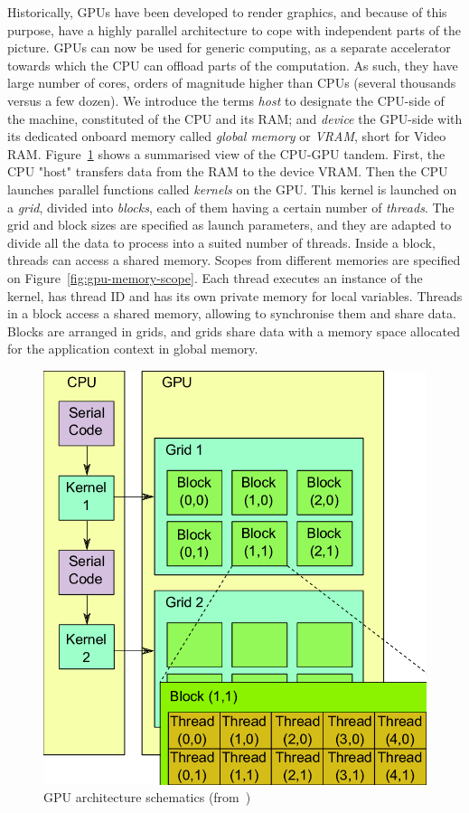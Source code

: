 Historically, GPUs have been developed to render graphics, and because of this purpose, have a highly parallel architecture to cope with independent parts of the picture. GPUs can now be used for generic computing, as a separate accelerator towards which the CPU can offload parts of the computation. As such, they have large number of cores, orders of magnitude higher than CPUs (several thousands versus a few dozen). We introduce the terms \emph{host} to designate the CPU-side of the machine, constituted of the CPU and its RAM; and \emph{device} the GPU-side with its dedicated onboard memory called \emph{global memory} or \emph{VRAM}, short for Video RAM. Figure~\ref{fig:gpu-arch} shows a summarised view of the CPU-GPU tandem. First, the CPU "host" transfers data from the RAM to the device VRAM. Then the CPU launches parallel functions called \emph{kernels} on the GPU. This kernel is launched on a \emph{grid}, divided into \emph{blocks}, each of them having a certain number of \emph{threads}. The grid and block sizes are specified as launch parameters, and they are adapted to divide all the data to process into a suited number of threads. Inside a block, threads can access a shared memory. Scopes from different memories are specified on Figure~\ref{fig:gpu-memory-scope}. Each thread executes an instance of the kernel, has thread ID and has its own private memory for local variables. Threads in a block access a shared memory, allowing to synchronise them and share data. Blocks are arranged in grids, and grids share data with a memory space allocated for the application context in global memory.

\begin{figure}[h]
	\centering
	\includegraphics[width=0.6\linewidth]{gpu-arch}
	\caption{GPU architecture schematics (from~\cite{Bartezzaghi:gpu-arch})}
	\label{fig:gpu-arch}
\end{figure}

